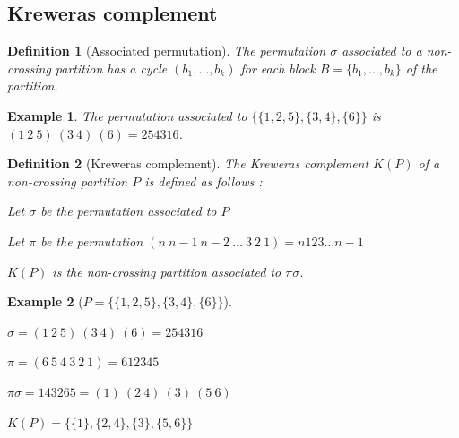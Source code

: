 \documentclass[12pt]{report}
\newtheorem{definition}{Definition}
\newtheorem*{example}{Example}
\begin{document}
\subsection{Kreweras complement}

\begin{definition}[Associated permutation]
    The \emph{permutation} $\sigma$ associated to a non-crossing
    partition has a cycle $(b_1, \ldots, b_k)$ for each block
    $B = \{b_1, \ldots, b_k\}$ of the partition.
\end{definition}

\begin{example}
    The permutation associated to $\{\{1, 2, 5\}, \{3, 4\}, \{6\}\}$
    is $(1\ 2\ 5)\ (3\ 4)\ (6) = 254316$.
\end{example}

\begin{definition}[Kreweras complement]
    The \emph{Kreweras complement} $K (P)$ of a non-crossing
    partition $P$ is defined as follows :\\
    \begin{itemize*}
        \item Let $\sigma$ be the permutation associated to $P$\\
        \item Let $\pi$ be the permutation $(n\ n-1\ n-2\
        \ldots\ 3\ 2\ 1) = n123 \ldots n-1$\\
        \item $K (P)$ is the \emph{non-crossing partition}
        associated to $\pi \sigma$.\\
    \end{itemize*}
\end{definition}

\begin{example}[$P = \{\{1, 2, 5\}, \{3, 4\}, \{6\}\}$]
    \text {} \\
    \begin{itemize*}
        \item $\sigma = (1\ 2\ 5)\ (3\ 4)\ (6) = 254316$\\
        \item $\pi = (6\ 5\ 4\ 3\ 2\ 1) = 612345$\\
        \item $\pi \sigma = 143265 = (1)\ (2\ 4)\ (3)\ (5\ 6)$\\
        \item $K(P) = \{\{1\},\{2, 4\}, \{3\}, \{5, 6\}\}$\\
    \end{itemize*}
\end{example}
\end{document}
